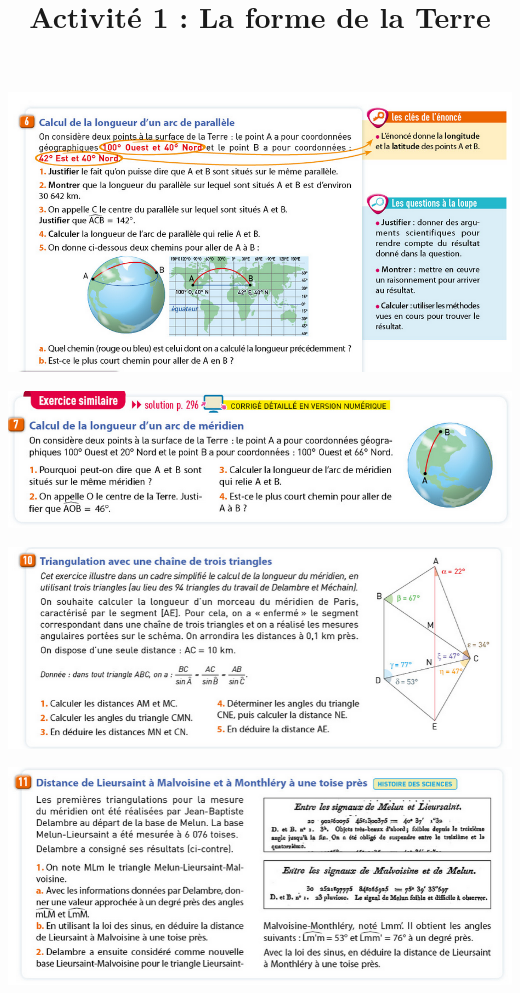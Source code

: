\documentclass[10pt]{article}
\newcommand{\titreActivite}{Activité 1 : La forme de la Terre} %
\newcommand{\myscale}{0.57}
\begin{document}
\date{}
\title{\titreActivite}
\maketitle %


\begin{center}
	\includegraphics[scale=\myscale]{assets/6.png}
	\vspace{10pt}

	\includegraphics[scale=\myscale]{assets/7.png}



	\includegraphics[scale=\myscale]{assets/10.png}

	\includegraphics[scale=\myscale]{assets/11.png}


\end{center}
\end{document}
